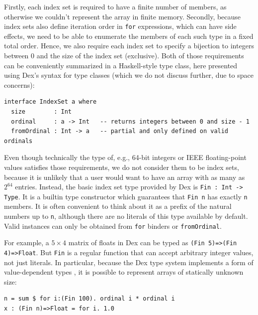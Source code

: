 \documentclass[acmsmall,screen,nonacm]{acmart}
\newlength{\codeindent}
\begin{document}
Firstly, each index set is required to have a finite number of members, as otherwise we couldn't represent the array in finite memory.
Secondly, because index sets also define iteration order in \texttt{for} expressions, which can have side effects, we need to be able to enumerate the members of each such type in a fixed total order.
Hence, we also require each index set to specify a bijection to integers between 0 and the size of the index set (exclusive).
Both of those requirements can be conveniently summarized in a Haskell-style type class, here presented using Dex's syntax for type classes (which we do not discuss further, due to space concerns):
\begin{Verbatim}[xleftmargin=\codeindent,fontsize=\small]
interface IndexSet a where
  size        : Int
  ordinal     : a -> Int   -- returns integers between 0 and size - 1
  fromOrdinal : Int -> a   -- partial and only defined on valid ordinals
\end{Verbatim}

Even though technically the type of, e.g., 64-bit integers or IEEE floating-point values satisfies those requirements, we do not consider them to be index sets, because it is unlikely that a user would want to have an array with as many as $2^{64}$ entries.
Instead, the basic index set type provided by Dex is \verb|Fin : Int -> Type|.
It is a builtin type constructor which guarantees that \texttt{Fin n} has exactly \texttt{n} members.
It is often convenient to think about it as a prefix of the natural numbers up to \texttt{n}, although there are no literals of this type available by default.
Valid instances can only be obtained from \texttt{for} binders or \texttt{fromOrdinal}.

For example, a $5 \times 4$ matrix of floats in Dex can be typed as
\verb|(Fin 5)=>(Fin 4)=>Float|.
But \texttt{Fin} is a regular function that can accept arbitrary integer values, not just literals.
In particular, because the Dex type system implements a form of value-dependent types \cite{swamy2011valuedependent}, it is possible to represent arrays of statically unknown size:
\begin{Verbatim}[xleftmargin=\codeindent,fontsize=\small]
n = sum $ for i:(Fin 100). ordinal i * ordinal i
x : (Fin n)=>Float = for i. 1.0
\end{Verbatim}
\end{document}
